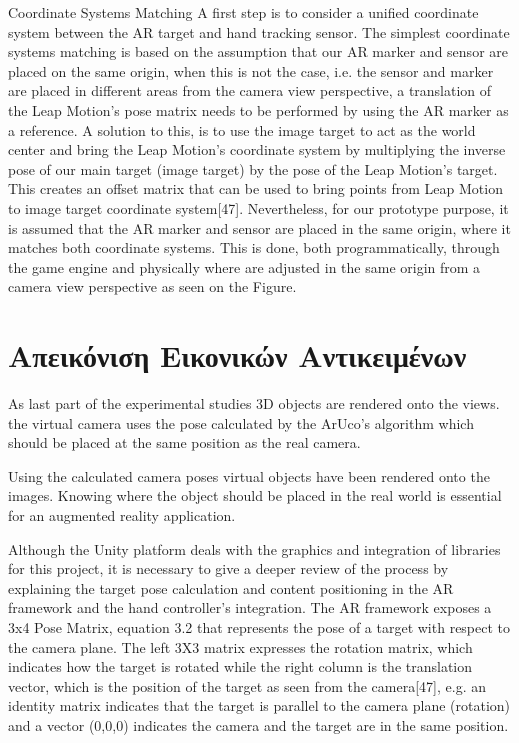 Coordinate Systems Matching A first step is to consider a unified coordinate system between the AR target and hand tracking sensor. The simplest coordinate systems matching is based on the assumption that our AR marker and sensor are placed on the same origin, when this is not the case, i.e. the sensor and marker are placed in different areas from the camera view perspective, a translation of the Leap Motion’s pose matrix needs to be performed by using the AR marker as a reference. A solution to this, is to use the image target to act as the world center and bring the Leap Motion’s coordinate system by multiplying the inverse pose of our main target (image target) by the pose of the Leap Motion’s target. This creates an offset matrix that can be used to bring points from Leap Motion to image target coordinate system[47]. Nevertheless, for our prototype purpose, it is assumed that the AR marker and sensor are placed in the same origin, where it matches both coordinate systems. This is done, both programmatically, through the game engine and physically where are adjusted in the same origin from a camera view perspective as seen on the Figure.


\section{Απεικόνιση Εικονικών Αντικειμένων} \label{s:rendering}


As last part of the experimental studies 3D objects are rendered onto the views. the virtual camera uses the pose calculated by the ArUco's algorithm which should be placed at the same position as the real camera. 

Using the calculated camera poses virtual objects have been rendered onto the images. Knowing where the object should be placed in the real world is essential for an augmented reality application. 



Although the Unity platform deals with the graphics and integration of libraries for this project, it is necessary to give a deeper review of the process by explaining the target pose calculation and content positioning in the AR framework and the hand controller’s integration. The AR framework exposes a 3x4 Pose Matrix, equation 3.2 that represents the pose of a target with respect to the camera plane. The left 3X3 matrix expresses the rotation matrix, which indicates how the target is rotated while the right column is the translation vector, which is the position of the target as seen from the camera[47], e.g. an identity matrix indicates that the target is parallel to the camera plane (rotation) and a vector (0,0,0) indicates the camera and the target are in the same position.

